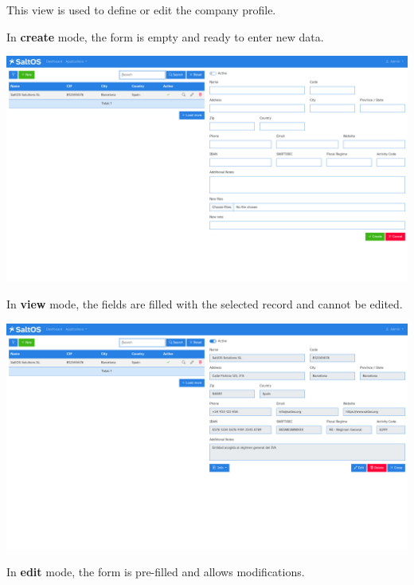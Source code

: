 \documentclass[a4paper]{article}
\begin{document}
This view is used to define or edit the company profile.

In \textbf{create} mode, the form is empty and ready to enter new data.

\begin{center}\includegraphics[width=1\textwidth]{../ujest/snaps/test-screenshots-js-screenshots-company-company-create-en-us-1-snap.png}\end{center}

In \textbf{view} mode, the fields are filled with the selected record and cannot be edited.

\begin{center}\includegraphics[width=1\textwidth]{../ujest/snaps/test-screenshots-js-screenshots-company-company-view-1-en-us-1-snap.png}\end{center}

In \textbf{edit} mode, the form is pre-filled and allows modifications.
\end{document}
